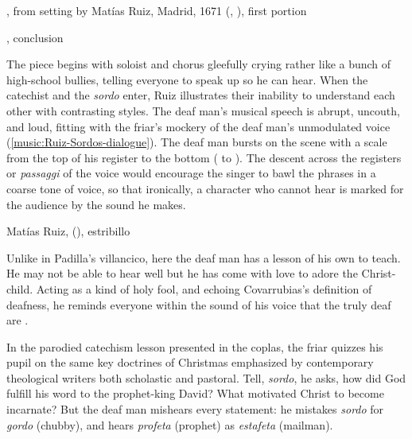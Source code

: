 \begin{poemexample}
    \caption{,
    from setting by Matías Ruiz, Madrid, 1671 (,
    ), first portion}

    \label{poem:Pues_la_fiesta-Ruiz-1}
\end{poemexample}

\begin{poemexample}
    \caption{,
    conclusion}

    \label{poem:Pues_la_fiesta-Ruiz-2}
\end{poemexample}

The piece begins with soloist and chorus gleefully crying  rather like a bunch of high-school bullies, telling everyone to speak
up so he can hear.
When the catechist and the \emph{sordo} enter, Ruiz illustrates their inability
to understand each other with contrasting styles.
The deaf man's musical speech is abrupt, uncouth, and loud, fitting with the
friar's mockery of the deaf man's unmodulated voice
(\cref{music:Ruiz-Sordos-dialogue}).
The deaf man bursts on the scene with a scale from the top of his register to
the bottom ( to ).
The descent across the registers or \emph{passaggi} of the voice would encourage
the singer to bawl the phrases in a coarse tone of voice, so that ironically, a
character who cannot hear is marked for the audience by the sound he makes.

\begin{musicexample}
    \caption{Matías Ruiz,  (), estribillo} 

    \label{music:Ruiz-Sordos-dialogue}
\end{musicexample}

Unlike in Padilla's villancico, here the deaf man has a lesson of his own to
teach.
He may not be able to hear well but he has come with love to adore the
Christ-child.
Acting as a kind of holy fool, and echoing Covarrubias's definition of deafness,
he reminds everyone within the sound of his voice that the truly deaf are
.

In the parodied catechism lesson presented in the coplas, the friar quizzes his
pupil on the same key doctrines of Christmas emphasized by contemporary
theological writers both scholastic and pastoral.%
    \Autocite[]{Cashner:PhD} %
Tell, \emph{sordo}, he asks, how did God fulfill his word to the prophet-king
David?  What motivated Christ to become incarnate? But the deaf man mishears
every statement: he mistakes \emph{sordo} for \emph{gordo} (chubby), and hears
\emph{profeta} (prophet) as \emph{estafeta} (mailman).

